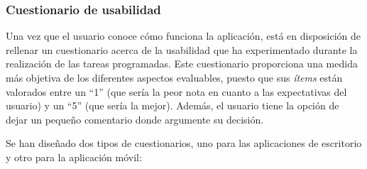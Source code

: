 \subsubsection{Cuestionario de usabilidad}
Una vez que el usuario conoce cómo funciona la aplicación, está en
disposición de rellenar un cuestionario acerca de la usabilidad que ha
experimentado durante la realización de las tareas programadas. Este 
cuestionario proporciona una medida más objetiva de los diferentes aspectos
evaluables, puesto que sus \emph{ítems} están valorados entre un ``1'' (que 
sería la peor nota en cuanto a las expectativas del usuario) y un ``5'' (que 
sería la mejor). Además, el usuario tiene la opción de dejar un pequeño 
comentario donde argumente su decisión.

Se han diseñado dos tipos de cuestionarios, uno para las aplicaciones de
escritorio y otro para la aplicación móvil:
